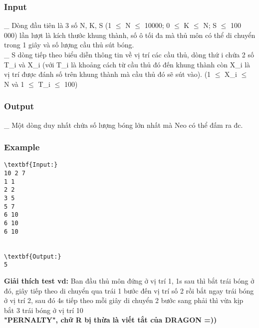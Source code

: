 \subsubsection{   Input  }

   \_ Dòng đầu tiên là 3 số N, K, S (1 $\le$  N  $\le$ 10000; 0 $\le$  K  $\le$ N; S $\le$ 100 000) lần lượt là kích thước khung thành, số ô tối đa mà thủ môn có thể di chuyển trong 1 giây và số lượng cầu thủ sút bóng.   
\\   \_ S dòng tiếp theo biểu diễn thông tin về vị trí các cầu thủ, dòng thứ i chứa 2 số T\_i và X\_i (với T\_i là khoảng cách từ cầu thủ đó đến khung thành còn X\_i là vị trí được đánh số trên khung thành mà cầu thủ đó sẽ sút vào). (1 $\le$  X\_i  $\le$ N và 1 $\le$  T\_i  $\le$ 100)  

\subsubsection{   Output  }

   \_ Một dòng duy nhất chứa số lượng bóng lớn nhất mà Neo có thể đấm ra đc.  

\subsubsection{   Example  }
\begin{verbatim}
\textbf{Input:}
10 2 7
1 1
2 2
3 5
5 7
6 10
6 10
6 10


\textbf{Output:}
5
\end{verbatim}

\textbf{    Giải thích test vd:   }   Ban đầu thủ môn đứng ở vị trí 1, 1s sau thì bắt trái bóng ở đó, giây tiếp theo di chuyển qua trái 1 bước đến vị trí số 2 rồi bắt ngay trái bóng ở vị trí 2, sau đó 4s tiếp theo mỗi giây di chuyển 2 bước sang phải thì vừa kịp bắt 3 trái bóng ở vị trí 10   
\\\textbf{    "PERNALTY", chữ R bị thừa là viết tắt của DRAGON =))   }
